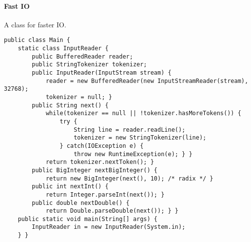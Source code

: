 \paragraph{Fast IO}
A class for faster IO.

\begin{verbatim}
public class Main {
	static class InputReader {
		public BufferedReader reader;
		public StringTokenizer tokenizer;
		public InputReader(InputStream stream) {
			reader = new BufferedReader(new InputStreamReader(stream), 32768);
			tokenizer = null; }
		public String next() {
			while(tokenizer == null || !tokenizer.hasMoreTokens()) {
				try {
					String line = reader.readLine();
					tokenizer = new StringTokenizer(line);
				} catch(IOException e) {
					throw new RuntimeException(e); } }
			return tokenizer.nextToken(); }
		public BigInteger nextBigInteger() {
			return new BigInteger(next(), 10); /* radix */ }
		public int nextInt() {
			return Integer.parseInt(next()); }
		public double nextDouble() {
			return Double.parseDouble(next()); } }
	public static void main(String[] args) {
		InputReader in = new InputReader(System.in);
	} }
\end{verbatim}
